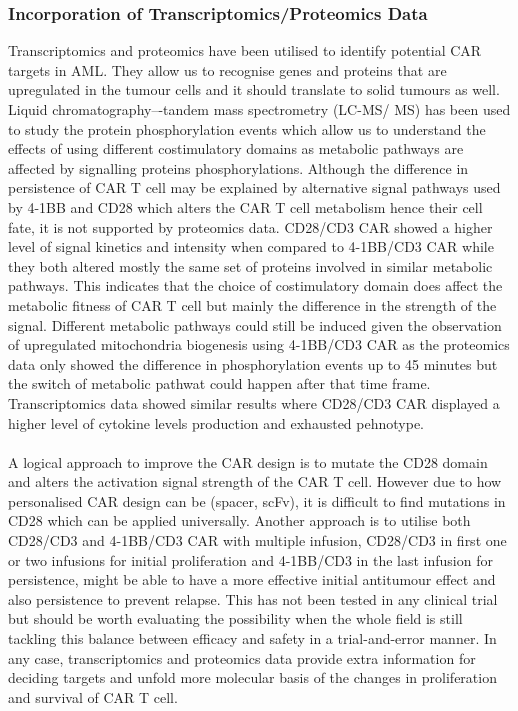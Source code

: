 \documentclass[12pt,oneside]{report}
\begin{document}
\subsubsection{Incorporation of Transcriptomics/Proteomics Data}
Transcriptomics and proteomics have been utilised to identify potential CAR targets in AML\citep{trans}. They allow us to recognise genes and proteins that are upregulated in the tumour cells and it should translate to solid tumours as well. Liquid chromatography–-tandem mass spectrometry (LC-MS/
MS) has been used to study the protein phosphorylation events\citep{trans-2} which allow us to understand the effects of using different costimulatory domains as metabolic pathways are affected by signalling proteins phosphorylations. Although the difference in persistence of CAR T cell may be explained by alternative signal pathways used by 4-1BB and CD28\citep{CD28-2} which alters the CAR T cell metabolism hence their cell fate, it is not supported by proteomics data. CD28/CD3\textzeta{} CAR showed a higher level of signal kinetics and intensity\citep{trans-2} when compared to 4-1BB/CD3\textzeta{} CAR while they both altered mostly the same set of proteins involved in similar metabolic pathways\citep{trans-2}. This indicates that the choice of costimulatory domain does affect the metabolic fitness of CAR T cell but mainly the difference in the strength of the signal. Different metabolic pathways could still be induced given the observation of upregulated mitochondria biogenesis using 4-1BB/CD3\textzeta{} CAR\citep{CD28-2} as the proteomics data only showed the difference in phosphorylation events up to 45 minutes but the switch of metabolic pathwat could happen after that time frame. Transcriptomics data showed similar results where CD28/CD3\textzeta{} CAR displayed a higher level of cytokine levels production and exhausted pehnotype\citep{trans-2}. 
\\\\A logical approach to improve the CAR design is to mutate the CD28 domain and alters the activation signal strength of the CAR T cell. However due to how personalised CAR design can be (spacer, scFv), it is difficult to find mutations in CD28 which can be applied universally. Another approach is to utilise both CD28/CD3\textzeta{} and 4-1BB/CD3\textzeta{} CAR with multiple infusion, CD28/CD3\textzeta{} in first one or two infusions for initial proliferation and 4-1BB/CD3\textzeta{} in the last infusion for persistence, might be able to have a more effective initial antitumour effect and also persistence to prevent relapse. This has not been tested in any clinical trial but should be worth evaluating the possibility when the whole field is still tackling this balance between efficacy and safety in a trial-and-error manner. In any case, transcriptomics and proteomics data provide extra information for deciding targets and unfold more molecular basis of the changes in proliferation and survival of CAR T cell.
\end{document}
